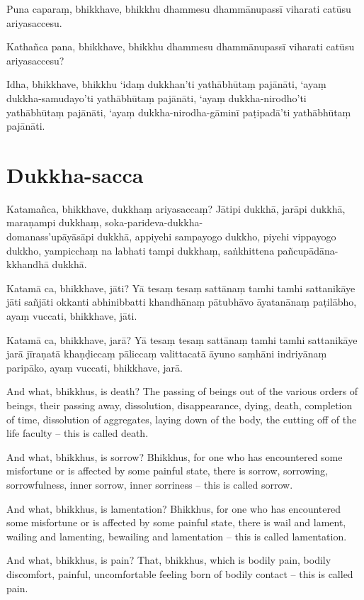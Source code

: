 Puna caparaṃ, bhikkhave, bhikkhu dhammesu dhammānupassī viharati catūsu
ariyasaccesu.

Kathañca pana, bhikkhave, bhikkhu dhammesu dhammānupassī viharati catūsu
ariyasaccesu?

Idha, bhikkhave, bhikkhu ‘idaṃ dukkhan’ti yathābhūtaṃ pajānāti, ‘ayaṃ
dukkha-samudayo’ti yathābhūtaṃ pajānāti, ‘ayaṃ dukkha-nirodho’ti yathābhūtaṃ
pajānāti, ‘ayaṃ dukkha-nirodha-gāminī paṭipadā’ti yathābhūtaṃ pajānāti.

\section*{Dukkha-sacca}

Katamañca, bhikkhave, dukkhaṃ ariyasaccaṃ? Jātipi dukkhā, jarāpi dukkhā,
maraṇampi dukkhaṃ, soka-parideva-dukkha-\\ domanass'upāyāsāpi dukkhā, appiyehi
sampayogo dukkho, piyehi vippayogo dukkho, yampicchaṃ na labhati tampi dukkhaṃ,
saṅkhittena pañcupādāna-kkhandhā dukkhā.

Katamā ca, bhikkhave, jāti? Yā tesaṃ tesaṃ sattānaṃ tamhi tamhi sattanikāye jāti
sañjāti okkanti abhinibbatti khandhānaṃ pātubhāvo āyatanānaṃ paṭilābho, ayaṃ
vuccati, bhikkhave, jāti.

Katamā ca, bhikkhave, jarā? Yā tesaṃ tesaṃ sattānaṃ tamhi tamhi sattanikāye jarā
jīraṇatā khaṇḍiccaṃ pāliccaṃ valittacatā āyuno saṃhāni indriyānaṃ paripāko, ayaṃ
vuccati, bhikkhave, jarā.

\englishPage

And what, bhikkhus, is death? The passing of beings out of the various orders of
beings, their passing away, dissolution, disappearance, dying, death, completion
of time, dissolution of aggregates, laying down of the body, the cutting off of
the life faculty -- this is called death.

And what, bhikkhus, is sorrow? Bhikkhus, for one who has encountered some
misfortune or is affected by some painful state, there is sorrow, sorrowing,
sorrowfulness, inner sorrow, inner sorriness -- this is called sorrow.

And what, bhikkhus, is lamentation? Bhikkhus, for one who has encountered some
misfortune or is affected by some painful state, there is wail and lament,
wailing and lamenting, bewailing and lamentation -- this is called lamentation.

And what, bhikkhus, is pain? That, bhikkhus, which is bodily pain, bodily
discomfort, painful, uncomfortable feeling born of bodily contact -- this is
called pain.

